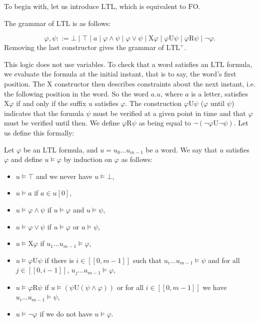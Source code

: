 \documentclass[a4paper,UKenglish,cleveref, autoref, thm-restate]{lipics-v2021}
\newcommand{\FO}{\mathrm{FO}}
\newcommand{\LTL}{\mathrm{LTL}}
\newcommand{\LTLp}{\LTL^+}
\newcommand{\X}{\mathrm{X}}
\newcommand{\U}{\mathrm{U}}
\newcommand{\R}{\mathrm{R}}
\begin{document}
To begin with, let us introduce $\LTL$, which is equivalent to $\FO$.


\begin{definition}
    The grammar of $\LTL$ is as follows:
    \vspace{-1em}
    
    $$\varphi, \psi::= \bot \mid \top \mid a \mid \varphi \land \psi \mid \varphi \lor \psi \mid \X \varphi \mid \varphi \U \psi \mid \varphi \R \psi \mid \neg \varphi.
    $$
    Removing the last constructor gives the grammar of $\LTLp$.
\end{definition}

This logic does not use variables. To check that a word satisfies an $\LTL$ formula, we evaluate the formula at the initial instant, that is to say, the word's first position. The $\X$ constructor then describes constraints about the next instant, i.e. the following position in the word. So the word $a.u$, where $a$ is a letter, satisfies $\X \varphi$ if and only if the suffix $u$ satisfies $\varphi$. The construction $\varphi \U \psi$ ($\varphi$ until $\psi$) indicates that the formula $\psi$ must be verified at a given point in time and that $\varphi$ must be verified until then. We define $\varphi \R \psi$ as being equal to $\neg (\neg \varphi \U \neg \psi)$.
Let us define this formally:


\begin{definition}
    Let $\varphi$ be an $\LTL$ formula, and $u = u_0...u_{m-1}$ be a word. We say that $u$ satisfies $\varphi$ and define $u \models \varphi$ by induction on $\varphi$ as follows:
    \begin{itemize}
        \item $u \models \top$ and we never have $u \models \bot$,
        \item $u \models a$ if $a \in u[0]$,
        \item $u \models \varphi \land \psi$ if $u \models \varphi$ and $u \models \psi$,
        \item $u \models \varphi \lor \psi$ if $u \models \varphi$ or $u \models \psi$,
        \item $u \models \X \varphi$ if $u_1...u_{m-1} \models \varphi$,
        \item $u \models \varphi \U \psi$ if there is $i\in[\![0,m-1]\!]$ such that $u_i...u_{m-1} \models \psi$ and for all $j\in[\![0,i-1]\!]$, $u_j...u_{m-1} \models \varphi$,
\item $u \models \varphi \R \psi$ if $u \models (\psi \U (\psi \wedge \varphi))$ or for all $i\in[\![0,m-1]\!]$ we have $u_i...u_{m-1} \models \psi$,
        \item $u \models \neg \varphi$ if we do not have $u \models \varphi$.
    \end{itemize}
\end{definition}
\end{document}

